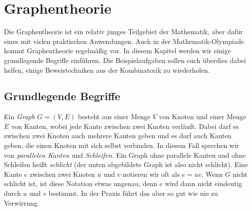 \section{Graphentheorie}\label{kapitel:Graphentheorie}
Die Graphentheorie ist ein relativ junges Teilgebiet der Mathematik, aber dafür eines mit vielen praktischen Anwendungen. Auch in der Mathematik-Olympiade kommt Graphentheorie regelmäßig vor. In diesem Kapitel werden wir einige grundlegende Begriffe einführen. Die Beispielaufgaben sollen euch überdies dabei helfen, einige Beweistechniken aus der Kombinatorik zu wiederholen.

\subsection*{Grundlegende Begriffe}
Ein \emph{Graph} $G=(V,E)$ besteht aus einer Menge $V$ von Knoten und einer Menge~$E$ von Kanten, wobei jede Kante zwischen zwei Knoten verläuft. Dabei darf es zwischen zwei Knoten auch mehrere Kanten geben und es darf auch Kanten geben, die einen Knoten mit sich selbst verbinden. In diesem Fall sprechen wir von \emph{parallelen Kanten} und \emph{Schleifen}. Ein Graph ohne parallele Kanten und ohne Schleifen heißt \emph{schlicht} (der unten abgebildete Graph ist also nicht schlicht). Eine Kante $e$ zwischen zwei Knoten $u$ und $v$ notieren wir oft als $e=uv$. Wenn $G$ nicht schlicht ist, ist diese Notation etwas ungenau, denn $e$ wird dann nicht eindeutig durch $u$ und $v$ bestimmt. In der Praxis führt das aber so gut wie nie zu Verwirrung.

